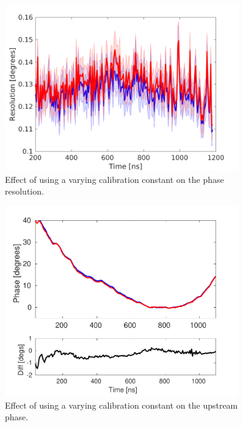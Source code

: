 \begin{figure}
  \centering
  \includegraphics[width=0.9\textwidth]{Figures/phaseMons/resolutionWithMultiSampleCal}
  \caption{Effect of using a varying calibration constant on the phase resolution.}
  \label{f:resolutionWithMultiSampleCal}
\end{figure}

\begin{figure}
  \centering
  \includegraphics[width=0.9\textwidth]{Figures/phaseMons/multiSampMon2Along}
  \caption{Effect of using a varying calibration constant on the upstream phase.}
  \label{f:multiSampMon2Along}
\end{figure}

